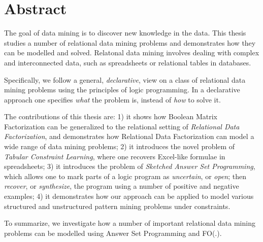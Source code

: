 \chapter{Abstract} \label{ch:abstract}
The goal of data mining is to discover new knowledge in the data. This
thesis studies a number of relational data mining problems and
demonstrates how they can be modelled and solved. Relatonal data
mining involves dealing with complex and interconnected data, such as
spreadsheets or relational tables in databases. 

Specifically, we follow a general, \textit{declarative}, view on a
class of relational data mining problems using the principles of logic
programming. In a declarative approach one specifies \textit{what} the
problem is, instead of \textit{how} to solve it. 

The contributions of this thesis are: 1) it shows how Boolean Matrix Factorization can be generalized to the
relational setting of \textit{Relational Data Factorization}, and 
demonstrates how Relational Data Factorization can model a wide range
of data mining problems; 2) it introduces the novel
problem of \textit{Tabular Constraint Learning}, where one recovers
Excel-like formulae in spreadsheets; 3) it introduces the problem of \textit{Sketched Answer Set
Programming}, which allows one to mark parts of a logic program as
\textit{uncertain}, or \textit{open}; then \textit{recover}, or
\textit{synthesize}, the program using a number of positive and
negative examples; 4) it demonstrates how our approach can be
applied to model various structured and unstructured pattern mining
problems under constraints.

\pubrev
To summarize, we investigate how a number of important relational data
mining problems can be modelled using Answer Set Programming and FO(.). 
\pubrevend

\cleardoublepage

